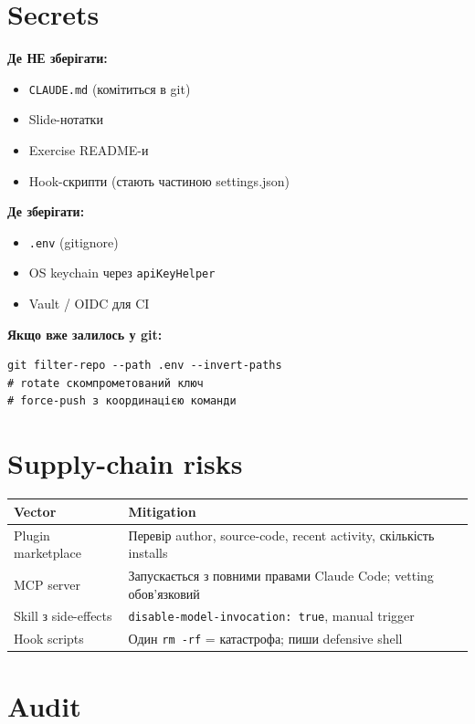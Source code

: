 \documentclass[11pt,a4paper]{article}
\begin{document}
\section{Secrets}

\textbf{Де НЕ зберігати:}

\begin{itemize}
\item \texttt{CLAUDE.md} (комітиться в git)
\item Slide-нотатки
\item Exercise README-и
\item Hook-скрипти (стають частиною settings.json)
\end{itemize}

\textbf{Де зберігати:}

\begin{itemize}
\item \texttt{.env} (gitignore)
\item OS keychain через \texttt{apiKeyHelper}
\item Vault / OIDC для CI
\end{itemize}

\textbf{Якщо вже залилось у git:}

\begin{lstlisting}
git filter-repo --path .env --invert-paths
# rotate скомпрометований ключ
# force-push з координацією команди
\end{lstlisting}

\section{Supply-chain risks}

\begin{tabular}{lp{8cm}}
\hline
\textbf{Vector} & \textbf{Mitigation} \\
\hline
Plugin marketplace & Перевір author, source-code, recent activity, скількість installs \\
MCP server & Запускається з повними правами Claude Code; vetting обов'язковий \\
Skill з side-effects & \texttt{disable-model-invocation: true}, manual trigger \\
Hook scripts & Один \texttt{rm -rf} = катастрофа; пиши defensive shell \\
\hline
\end{tabular}

\section{Audit}
\end{document}
